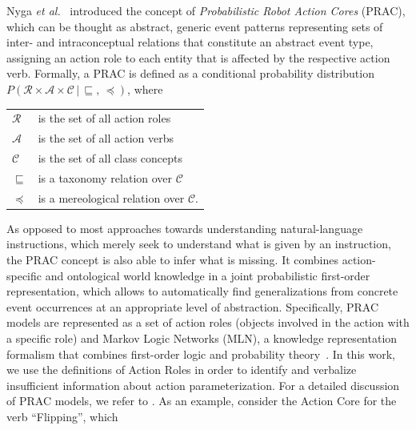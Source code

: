 \documentclass[oribibl]{llncs}
\begin{document}
Nyga \emph{et al.}~\cite{nyga12actioncore} introduced the concept of 
\emph{Probabilistic Robot Action Cores} (PRAC), which can be thought as abstract,
generic event patterns representing sets of 
inter- and intraconceptual relations that constitute an abstract 
event type, assigning an action role to each entity that is affected 
by the respective action verb. Formally, a PRAC is defined as a conditional
probability distribution
$P\left(\mathcal{R}\times\mathcal{A}\times\mathcal{C}\,|\,\sqsubseteq
,\, \preceq \right)\nonumber$, where 
{\small
\begin{center} \begin{tabular}{ll}
    $\mathcal{R}$  & is the set of all action roles\\
    $\mathcal{A}$  & is the set of all action verbs\\
    $\mathcal{C}$  & is the set of all class concepts\\
    $\sqsubseteq$ & is a taxonomy relation over $\mathcal{C}$\\
    $\preceq$	& is a mereological relation over $\mathcal{C}$.
\end{tabular}
\end{center}}
As opposed to most approaches towards understanding natural-language 
instructions, which merely seek to understand what is given by an 
instruction, the PRAC concept is also able to infer what is missing. 
It combines action-specific and ontological world knowledge in a 
joint probabilistic first-order representation, which allows to 
automatically find generalizations from concrete event occurrences 
at an appropriate level of abstraction. Specifically, PRAC models 
are represented as a set of action roles (objects involved in the 
action with a specific role) and Markov Logic Networks (MLN), a 
knowledge representation formalism that combines first-order logic 
and probability theory~\cite{DBLP:journals/ml/RichardsonD06}. In this
work, we use the definitions of Action Roles in order to identify and
verbalize insufficient information about action parameterization. For a 
detailed discussion of PRAC models, we refer to \cite{nyga12actioncore}.
As an example, consider the Action Core for the verb ``Flipping'', which
\end{document}
